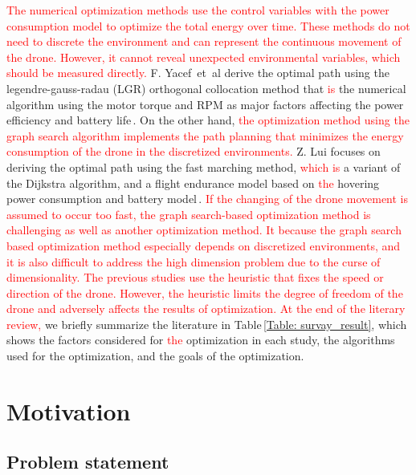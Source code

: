 \documentclass[journal]{./template/IEEEtran}
\begin{document}
\textcolor{red}{The numerical optimization methods use the control variables with the power consumption model to optimize the total energy over time. 
These methods do not need to discrete the environment and can represent the continuous movement of the drone. 
However, it cannot reveal unexpected environmental variables, which should be measured directly.}
F. Yacef~et~al derive the optimal path using the legendre-gauss-radau (LGR) orthogonal collocation method that \textcolor{red}{is} the numerical algorithm using the motor torque and RPM as major factors affecting the power efficiency and battery life\,\cite{ref_7}. 
On the other hand, \textcolor{red}{the optimization method using the graph search algorithm implements the path planning that minimizes the energy consumption of the drone in the discretized environments.}
Z. Lui focuses on deriving the optimal path using the fast marching method, \textcolor{red}{which is} a variant of the Dijkstra algorithm, and a flight endurance model based on \textcolor{red}{the} hovering power consumption and battery model\,\cite{ref_10}.
\textcolor{red}{If the changing of the drone movement is assumed to occur too fast, the graph search-based optimization method is challenging as well as another optimization method. It because the graph search based optimization method especially depends on discretized environments, and it is also difficult to address the high dimension problem due to the curse of dimensionality.
The previous studies use the heuristic that fixes the speed or direction of the drone. However, the heuristic limits the degree of freedom of the drone and adversely affects the results of optimization.}
\textcolor{red}{At the end of the literary review,} we briefly summarize the literature in Table\,\ref{Table: survay_result}, which shows the factors considered for \textcolor{red}{the} optimization in each study, the algorithms used for the optimization, and the goals of the optimization.

\label{Section: Related works}









\section{Motivation}




\subsection{Problem statement}
\end{document}
